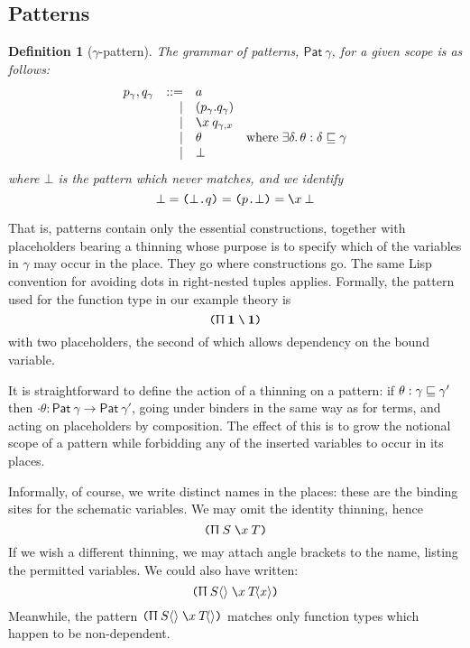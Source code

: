 \documentclass{jfp1}
\newtheorem{definition}[theorem]{Definition}
\newcommand{\Pa}[1]{\texttt{(}#1\texttt{)}}
\newcommand{\dt}{\texttt{.}}
\newcommand{\cn}[2]{\Pa{#1 \dt #2}}
\newcommand{\Se}{\mathsf}
\begin{document}
\subsection{Patterns}

\newcommand{\Pat}[1]{\Se{Pat}\:#1}
\begin{definition}[$\gamma$-pattern\label{def:pat}]
The grammar of patterns, $\Pat\gamma$, for a given scope is as follows:
\[\begin{array}{rrl@{\quad}l}
    p_\gamma, q_\gamma & ::= & a \\
         &   | & (p_\gamma.q_\gamma) \\
         &   | & \la x q_{\gamma,x} \\
         &   | & \theta & \mbox{where}\;\exists\delta.\,\theta :
                          \delta\thin\gamma \\
         &   | & \bot
  \end{array}\]
where $\bot$ is the pattern which \emph{never} matches, and we identify
\[\bot = \cn\bot q = \cn p\bot = \la x\bot
  \]
\end{definition}

\newcommand{\huth}[1]{\langle #1 \rangle}
That is, patterns contain only the essential constructions, together with
placeholders bearing a thinning whose purpose is to specify which of
the variables in $\gamma$ may occur in the place. They go where constructions
go. The same Lisp convention for avoiding dots in right-nested tuples applies.
Formally, the pattern used for the function type in our example theory is
\[
  \PI \ith {}\ith
\]
with two placeholders, the second of which allows dependency on the
bound variable.

It is straightforward to define the action of a thinning on a pattern: if
$\theta : \gamma\sqsubseteq\gamma'$ then $\cdot\theta :
\Pat\gamma\to\Pat{\gamma'}$, going under binders in the same way as
for terms, and acting on placeholders by composition.
The effect of this is to grow the notional scope of a pattern while
forbidding any of the inserted variables to occur in its places.

Informally, of course, we write distinct names in the places: these are the
binding sites for the schematic variables. We may omit the identity thinning,
hence
\[
  \PI SxT
\]
If we wish a different thinning, we may attach angle brackets to the name,
listing the permitted variables. We could also have written:
\[
  \PI{S\huth{}}x{T\!\huth{x}}
\]
Meanwhile, the pattern $\PI{S\huth{}}x{T\!\huth{}}$ matches only function types which
happen to be non-dependent.
\end{document}
